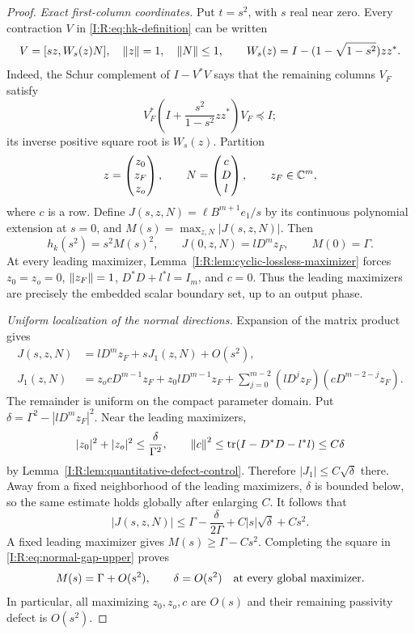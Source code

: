 \begin{proof}
\emph{Exact first-column coordinates.}
Put $t=s^2$, with $s$ real near zero.  Every contraction $V$ in
\eqref{I:R:eq:hk-definition} can be written
\begin{equation}
 V=[sz,W_s(z)N],\quad \left\lVert z\right\rVert=1,\quad \left\lVert N\right\rVert\le1,\qquad
 W_s(z)=I-(1-\sqrt{1-s^2})zz^*.
 \label{I:R:eq:first-column-chart}
\end{equation}
Indeed, the Schur complement of $I-V^*V$ says that the remaining columns
$V_F$ satisfy
\[
 V_F^*\left(I+\frac{s^2}{1-s^2}zz^*\right)V_F\preceq I;
\]
its inverse positive square root is $W_s(z)$.  Partition
\[
 z=\begin{pmatrix}z_0\\z_F\\z_o\end{pmatrix},\qquad
 N=\begin{pmatrix}c\\D\\l\end{pmatrix},
 \qquad z_F\in\mathbb C^m,
\]
where $c$ is a row.  Define $J(s,z,N)=\ell B^{m+1}e_1/s$ by its
continuous polynomial extension at $s=0$, and
$M(s)=\max_{z,N}|J(s,z,N)|$.  Then
\begin{equation}
 h_k(s^2)=s^2M(s)^2,\qquad J(0,z,N)=lD^mz_F,\qquad M(0)=\Gamma.
 \label{I:R:eq:M-and-J}
\end{equation}
At every leading maximizer, Lemma~\ref{I:R:lem:cyclic-lossless-maximizer}
forces $z_0=z_o=0$, $\left\lVert z_F\right\rVert=1$, $D^*D+l^*l=I_m$, and $c=0$.
Thus the leading maximizers are precisely the embedded scalar boundary
set, up to an output phase.

\emph{Uniform localization of the normal directions.}
Expansion of the matrix product gives
\begin{align}
 J(s,z,N)&=lD^mz_F+sJ_1(z,N)+O(s^2),
 \label{I:R:eq:J-first-order}\\
 J_1(z,N)&=z_ocD^{m-1}z_F+z_0lD^{m-1}z_F
       +\sum_{j=0}^{m-2}(lD^jz_F)(cD^{m-2-j}z_F).
 \label{I:R:eq:J1-explicit}
\end{align}
The remainder is uniform on the compact parameter domain.  Put
$\delta=\Gamma^2-|lD^mz_F|^2$.  Near the leading maximizers,
\[
 |z_0|^2+|z_o|^2\le\frac\delta{\Gamma^2},\qquad
 \left\lVert c\right\rVert^2\le\operatorname{tr}(I-D^*D-l^*l)\le C\delta
\]
by Lemma~\ref{I:R:lem:quantitative-defect-control}.  Therefore
$|J_1|\le C\sqrt\delta$ there.  Away from a fixed neighborhood of the
leading maximizers, $\delta$ is bounded below, so the same estimate holds
globally after enlarging $C$.  It follows that
\begin{equation}
 |J(s,z,N)|\le\Gamma-\frac\delta{2\Gamma}
                         +C|s|\sqrt\delta+Cs^2.
 \label{I:R:eq:normal-gap-upper}
\end{equation}
A fixed leading maximizer gives $M(s)\ge\Gamma-Cs^2$.
Completing the square in \eqref{I:R:eq:normal-gap-upper} proves
\begin{equation}
 M(s)=\Gamma+O(s^2),\qquad
 \delta=O(s^2)\quad\hbox{at every global maximizer.}
 \label{I:R:eq:normal-localization}
\end{equation}
In particular, all maximizing $z_0,z_o,c$ are $O(s)$ and their remaining
passivity defect is $O(s^2)$.


\end{proof}
